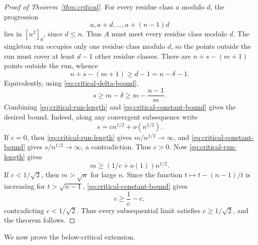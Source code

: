 \documentclass[10pt,a4paper]{amsart}
\numberwithin{equation}{section}
\begin{document}
\begin{proof}[Proof of Theorem~\ref{thm:critical}]
For every residue class $a$ modulo $d$, the progression
\[
        a,
        a+d,
        \ldots,
        a+(n-1)d
\]
lies in $[n^2]_0$, since $d\le n$.
Thus $A$ must meet every residue class modulo $d$.
The singleton run occupies only one residue class modulo $d$, so the points outside the run must cover at least $d-1$ other residue classes.
There are $n+s-(m+1)$ points outside the run, whence
\[
        n+s-(m+1)
        \ge
        d-1
        =n-\delta-1.
\]
Equivalently, using \eqref{eq:critical-delta-bound},
\begin{equation}\label{eq:critical-constant-bound}
        s\ge m-\delta
        \ge
        m-\frac{n-1}{m}.
\end{equation}
Combining \eqref{eq:critical-run-length} and \eqref{eq:critical-constant-bound} gives the desired bound.
Indeed, along any convergent subsequence write
\[
        s=c n^{1/2}+o(n^{1/2}).
\]
If $c=0$, then \eqref{eq:critical-run-length} gives $m/n^{1/2}\to\infty$, and \eqref{eq:critical-constant-bound} gives $s/n^{1/2}\to\infty$, a contradiction.
Thus $c>0$.
Now \eqref{eq:critical-run-length} gives
\[
        m\ge (1/c+o(1))n^{1/2}.
\]
If $c<1/\sqrt2$, then $m>\sqrt n$ for large $n$.
Since the function $t\mapsto t-(n-1)/t$ is increasing for $t>\sqrt{n-1}$, \eqref{eq:critical-constant-bound} gives
\[
        c\ge \frac1c-c,
\]
contradicting $c<1/\sqrt2$.
Thus every subsequential limit satisfies $c\ge1/\sqrt2$, and the theorem follows.
\end{proof}

We now prove the below-critical extension.
\end{document}
